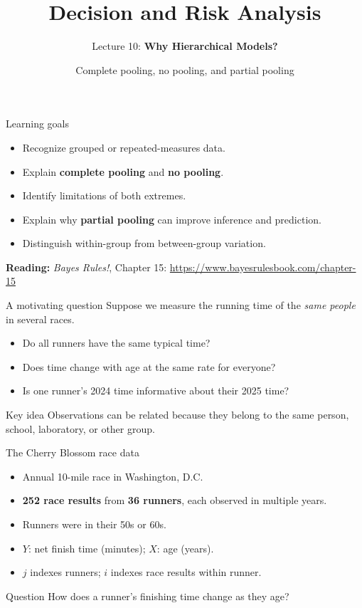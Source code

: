 \documentclass[aspectratio=43,11pt]{beamer}
\title{Decision and Risk Analysis}
\subtitle{Lecture 10: \textbf{Why Hierarchical Models?}}
\author{Complete pooling, no pooling, and partial pooling}
\date{\color{aggiemaroon}{DAEN 427 / ISEN 427 / ISEN 627 - Fall 2026\\
      \textbf{Alexander Abuabara}}}
\begin{document}
\begin{frame}\titlepage\end{frame}

\begin{frame}{Learning goals}
\begin{itemize}
\item Recognize grouped or repeated-measures data.
\item Explain \textbf{complete pooling} and \textbf{no pooling}.
\item Identify limitations of both extremes.
\item Explain why \textbf{partial pooling} can improve inference and prediction.
\item Distinguish within-group from between-group variation.
\end{itemize}
\vspace{.5cm}
\textbf{Reading:} \emph{Bayes Rules!}, Chapter 15: 
\url{https://www.bayesrulesbook.com/chapter-15}
\end{frame}

\begin{frame}{A motivating question}
Suppose we measure the running time of the \emph{same people} in several races.
\begin{itemize}
\item Do all runners have the same typical time?
\item Does time change with age at the same rate for everyone?
\item Is one runner's 2024 time informative about their 2025 time?
\end{itemize}
\begin{block}{Key idea}
Observations can be related because they belong to the same person, school, laboratory, or other group.
\end{block}
\end{frame}

\begin{frame}{The Cherry Blossom race data}
\begin{itemize}
\item Annual 10-mile race in Washington, D.C.
\item \textbf{252 race results} from \textbf{36 runners}, each observed in multiple years.
\item Runners were in their 50s or 60s.
\item \(Y\): net finish time (minutes); \(X\): age (years).
\item \(j\) indexes runners; \(i\) indexes race results within runner.
\end{itemize}
\begin{block}{Question}
How does a runner's finishing time change as they age?
\end{block}
\end{frame}
\end{document}
